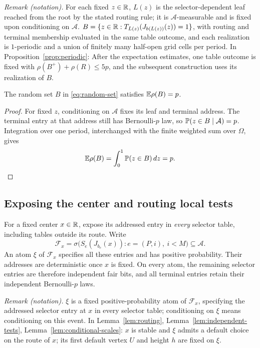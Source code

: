 \noindent\textit{Remark (notation).} For each fixed $z\in\mathbb R$, $L(z)$ is the selector-dependent leaf reached from the root by the stated routing rule; it is $\mathcal A$-measurable and is fixed upon conditioning on $\mathcal A$. $B=\{z\in\mathbb R:T_{L(z)}(J_{b(L(z))}(z))=1\}$, with routing and terminal membership evaluated in the same table outcome, and each realization is $1$-periodic and a union of finitely many half-open grid cells per period. In Proposition~\ref{prop:periodic}: After the expectation estimates, one table outcome is fixed with $\rho(B^+)+\rho(R)\le5p$, and the subsequent construction uses its realization of $B$.


\begin{lemma}
 \label{lem:density}
The random set \(B\) in \eqref{eq:random-set} satisfies
\(\mathbb E\rho(B)=p\).
\end{lemma}

\begin{proof}
For fixed \(z\), conditioning on \(\mathcal A\) fixes
its leaf and terminal address. The terminal entry at that address still
has Bernoulli-\(p\) law, so \(\mathbb P(z\in B\mid\mathcal A)=p\).
Integration over one period, interchanged with the finite weighted sum
over \(\Omega\), gives
\[
 \mathbb E\rho(B)=\int_0^1\mathbb P(z\in B)\,dz=p.
\]
\end{proof}

\subsection{Exposing the center and routing local tests}

For a fixed center \(x\in\mathbb R\), expose its addressed entry in
\emph{every} selector table, including tables outside its route. Write
\begin{equation}
 \label{eq:center-exposure}
 \mathcal F_x=
 \sigma\bigl(S_e(J_{b_e}(x)):e=(P,i),\ i<M\bigr)
 \subseteq\mathcal A.
\end{equation}
An atom \(\xi\) of \(\mathcal F_x\) specifies all these entries and
has positive probability. Their addresses are deterministic once \(x\)
is fixed. On every atom, the remaining selector entries are therefore
independent fair bits, and all terminal entries retain their independent
Bernoulli-\(p\) laws.

\noindent\textit{Remark (notation).} $\xi$ is a fixed positive-probability atom of $\mathcal F_x$, specifying the addressed selector entry at $x$ in every selector table; conditioning on $\xi$ means conditioning on this event. In Lemma~\ref{lem:routing}, Lemma~\ref{lem:independent-tests}, Lemma~\ref{lem:conditional-scales}: $x$ is stable and $\xi$ admits a default choice on the route of $x$; its first default vertex $U$ and height $h$ are fixed on $\xi$.



